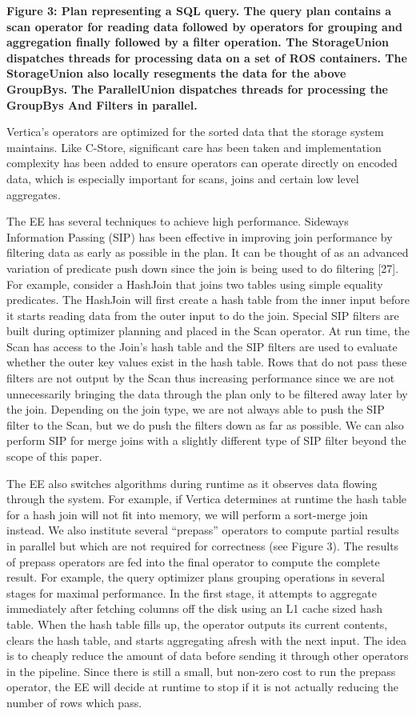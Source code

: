 \documentclass[a4paper,12pt,notitlepage,twoside,openright]{article}
\begin{document}
\textbf{Figure 3: Plan representing a SQL query. The query plan contains
a scan operator for reading data followed by operators for grouping and
aggregation finally followed by a filter operation. The StorageUnion
dispatches threads for processing data on a set of ROS containers. The
StorageUnion also locally resegments the data for the above GroupBys.
The ParallelUnion dispatches threads for processing the GroupBys And
Filters in parallel.}

Vertica's operators are optimized for the sorted data that the storage
system maintains. Like C-Store, significant care has been taken and
implementation complexity has been added to ensure operators can operate
directly on encoded data, which is especially important for scans, joins
and certain low level aggregates.

The EE has several techniques to achieve high performance. Sideways
Information Passing (SIP) has been effective in improving join
performance by filtering data as early as possible in the plan. It can
be thought of as an advanced variation of predicate push down since the
join is being used to do filtering {[}27{]}. For example, consider a
HashJoin that joins two tables using simple equality predicates. The
HashJoin will first create a hash table from the inner input before it
starts reading data from the outer input to do the join. Special SIP
filters are built during optimizer planning and placed in the Scan
operator. At run time, the Scan has access to the Join's hash table and
the SIP filters are used to evaluate whether the outer key values exist
in the hash table. Rows that do not pass these filters are not output by
the Scan thus increasing performance since we are not unnecessarily
bringing the data through the plan only to be filtered away later by the
join. Depending on the join type, we are not always able to push the SIP
filter to the Scan, but we do push the filters down as far as possible.
We can also perform SIP for merge joins with a slightly different type
of SIP filter beyond the scope of this paper.

The EE also switches algorithms during runtime as it observes data
flowing through the system. For example, if Vertica determines at
runtime the hash table for a hash join will not fit into memory, we will
perform a sort-merge join instead. We also institute several ``prepass''
operators to compute partial results in parallel but which are not
required for correctness (see Figure 3). The results of prepass
operators are fed into the final operator to compute the complete
result. For example, the query optimizer plans grouping operations in
several stages for maximal performance. In the first stage, it attempts
to aggregate immediately after fetching columns off the disk using an L1
cache sized hash table. When the hash table fills up, the operator
outputs its current contents, clears the hash table, and starts
aggregating afresh with the next input. The idea is to cheaply reduce
the amount of data before sending it through other operators in the
pipeline. Since there is still a small, but non-zero cost to run the
prepass operator, the EE will decide at runtime to stop if it is not
actually reducing the number of rows which pass.
\end{document}
